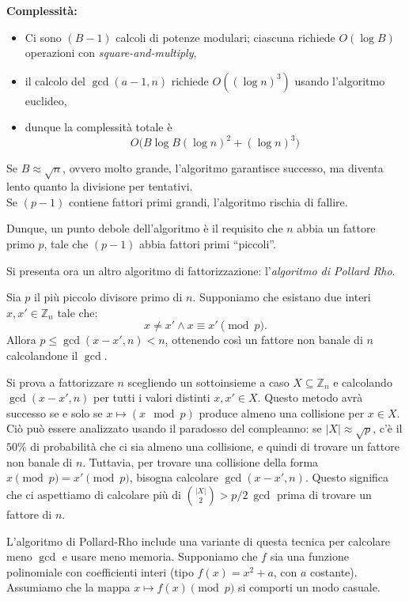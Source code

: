 \vspace{0.2cm}\noindent \textbf{Complessità:}  
\begin{itemize}
    \item Ci sono $(B-1)$ calcoli di potenze modulari; ciascuna richiede $O(\log B)$ operazioni con \textit{square-and-multiply},
    \item il calcolo del $\gcd(a-1,n)$ richiede $O((\log n)^3)$ usando l'algoritmo euclideo,
    \item dunque la complessità totale è
    \[
    O\big(B \log B (\log n)^2 + (\log n)^3\big)
    \]
\end{itemize}
\noindent Se $B\approx \sqrt{n}$, ovvero molto grande, l'algoritmo garantisce successo, ma diventa lento quanto la divisione per tentativi. \\ Se $(p-1)$ contiene fattori primi grandi, l'algoritmo rischia di fallire. 

\vspace{0.2cm}\noindent Dunque, un punto debole dell'algoritmo è il requisito che $n$ abbia un fattore primo $p$, tale che $(p-1)$ abbia fattori primi ``piccoli''.  

\vspace{0.2cm} \noindent Si presenta ora un altro algoritmo di fattorizzazione: l'\textit{algoritmo di Pollard Rho}.


\noindent Sia $p$ il più piccolo divisore primo di $n$. Supponiamo che esistano due interi $x,x' \in \mathbb{Z}_n$ tale che:
\[  
x \neq x' \land x \equiv x' \pmod p.
\]
Allora $p \leq \gcd(x-x',n) <n$, ottenendo così un fattore non banale di $n$ calcolandone il $\gcd$. 

\vspace{0.2cm} \noindent Si prova a fattorizzare $n$ scegliendo un sottoinsieme a caso $X \subseteq \mathbb{Z}_n$ e calcolando $\gcd(x-x',n)$ per tutti i valori distinti $x,x' \in X$. Questo metodo avrà successo se e solo se $x \mapsto (x \mod p)$ produce almeno una collisione per $x \in X$. Ciò può essere analizzato usando il paradosso del compleanno: se $|X| \approx \sqrt{p}$, c'è il $50\%$ di probabilità che ci sia almeno una collisione, e quindi di trovare un fattore non banale di $n$. Tuttavia, per trovare una collisione della forma $x \pmod p=x' \pmod p$, bisogna calcolare $\gcd(x-x',n)$. Questo significa che ci aspettiamo di calcolare più di $\binom{|X|}{2}>p/2 \ \gcd$ prima di trovare un fattore di $n$. 

\vspace{0.2cm}\noindent L'algoritmo di Pollard-Rho include una variante di questa tecnica per calcolare meno $\gcd$ e usare meno memoria. Supponiamo che $f$ sia una funzione polinomiale con coefficienti interi (tipo $f(x)=x^2+a$, con $a$ costante). Assumiamo che la mappa $x \mapsto f(x) \pmod p$ si comporti un modo casuale.

